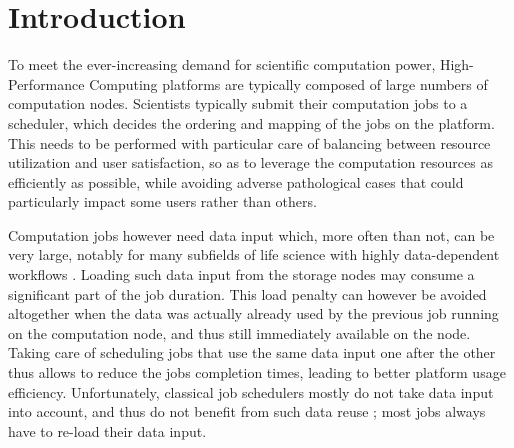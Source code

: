 \documentclass[sigconf,review,anonymous]{acmart}
\newcommand{\rev}[1]{{\color{blue}{#1}}}
\begin{document}
\begin{abstract}
  

\end{abstract}

\maketitle

\section{Introduction}\label{sec.introduction}

To meet the ever-increasing demand for scientific computation power,
High-Performance Computing platforms are typically composed of large
numbers of computation nodes. Scientists typically submit their
computation jobs to a scheduler, which decides the ordering and mapping
of the jobs on the platform. This needs to be performed with particular
care of balancing between resource utilization and user satisfaction, so
as to leverage the computation resources as efficiently as possible,
while avoiding adverse pathological cases that could particularly impact
some users rather than others.

Computation jobs however need data input which, more often than not, can
be very large, notably for many subfields of life science with highly
data-dependent workflows \rev{like taxonomic identification of DNA fragments, genome alignments or ancestral reconstructions}.
Loading such data input from the storage
nodes may consume a significant part of the job duration. This load
penalty can however be avoided altogether when the data was actually
already used by the previous job running on the computation node, and
thus still immediately available on the node. Taking care of scheduling
jobs that use the same data input one after the other thus allows to
reduce the jobs completion times, leading to better platform usage
efficiency. Unfortunately, classical job schedulers mostly do not take
data input into account, and thus do not benefit from such data reuse ;
most jobs always have to re-load their data input.
\end{document}
